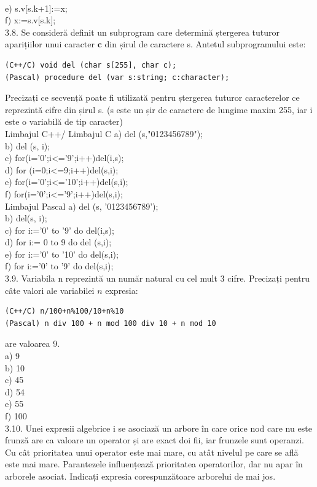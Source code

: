 \\
e) s.v[s.k+1]:=x;
\\
f) x:=s.v[s.k];
\\
3.8. Se consideră definit un subprogram care determină ștergerea tuturor aparițiilor unui caracter $\mathbf{c}$ din șirul de caractere s. Antetul subprogramului este:
\begin{verbatim}
(C++/C) void del (char s[255], char c); 
(Pascal) procedure del (var s:string; c:character); 
\end{verbatim}
Precizați ce secvență poate fi utilizată pentru ștergerea tuturor caracterelor ce reprezintă cifre din șirul s. (s este un șir de caractere de lungime maxim 255, iar i este o variabilă de tip caracter)
\\
Limbajul C++/ Limbajul C
a) del (s,"0123456789");
\\
b) del (s, i);
\\
c) for(i='0';i<='9';i++)del(i,s);
\\
d) for (i=0;i<=9;i++)del(s,i);
\\
e) for(i='0';i<='10';i++)del(s,i);
\\
f) for(i='0';i<='9';i++)del(s,i);
\\
Limbajul Pascal
a) del (s, '0123456789');
\\
b) del(s, i);
\\
c) for i:='0' to '9' do del(i,s);
\\
d) for i:= 0 to 9 do del (s,i);
\\
e) for i:='0' to '10' do del(s,i);
\\
f) for i:='0' to '9' do del(s,i);
\\
3.9. Variabila n reprezintă un număr natural cu cel mult 3 cifre. Precizați pentru câte valori ale variabilei $n$ expresia:
\begin{verbatim}
(C++/C) n/100+n%100/10+n%10
(Pascal) n div 100 + n mod 100 div 10 + n mod 10
\end{verbatim}
are valoarea 9.
\\
a) 9
\\
b) 10
\\
c) 45
\\
d) 54
\\
e) 55
\\
f) 100
\\
3.10. Unei expresii algebrice i se asociază un arbore în care orice nod care nu este frunză are ca valoare un operator și are exact doi fii, iar frunzele sunt operanzi. Cu cât prioritatea unui operator este mai mare, cu atât nivelul pe care se află este mai mare. Parantezele influențează prioritatea operatorilor, dar nu apar în arborele asociat. Indicați expresia corespunzătoare arborelui de mai jos.
